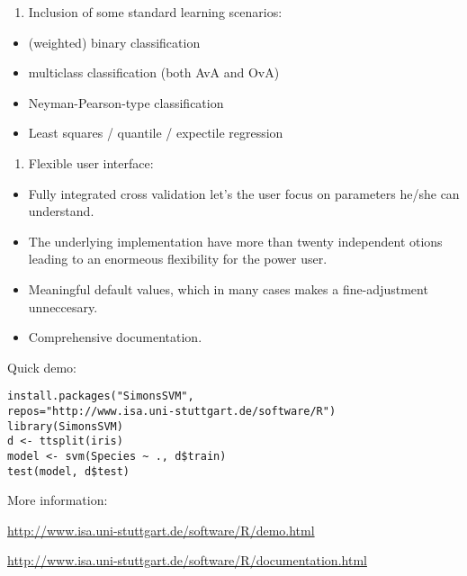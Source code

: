 \documentclass[11pt, a4paper]{article}
\providecommand{\tightlist}{%
  \setlength{\itemsep}{0pt}\setlength{\parskip}{0pt}}
\begin{document}
\begin{enumerate}
\def\labelenumi{\arabic{enumi}.}
\setcounter{enumi}{1}
\tightlist
\item
  Inclusion of some standard learning scenarios:
\end{enumerate}

\begin{itemize}
\tightlist
\item
  (weighted) binary classification
\item
  multiclass classification (both AvA and OvA)
\item
  Neyman-Pearson-type classification
\item
  Least squares / quantile / expectile regression
\end{itemize}

\begin{enumerate}
\def\labelenumi{\arabic{enumi}.}
\setcounter{enumi}{2}
\tightlist
\item
  Flexible user interface:
\end{enumerate}

\begin{itemize}
\tightlist
\item
  Fully integrated cross validation let's the user focus on parameters
  he/she can understand.
\item
  The underlying implementation have more than twenty independent otions
  leading to an enormeous flexibility for the power user.
\item
  Meaningful default values, which in many cases makes a fine-adjustment
  unneccesary.
\item
  Comprehensive documentation.
\end{itemize}

Quick demo:

\begin{verbatim}
install.packages("SimonsSVM",
repos="http://www.isa.uni-stuttgart.de/software/R")
library(SimonsSVM)
d <- ttsplit(iris)
model <- svm(Species ~ ., d$train)
test(model, d$test)
\end{verbatim}

More information:

\url{http://www.isa.uni-stuttgart.de/software/R/demo.html}

\url{http://www.isa.uni-stuttgart.de/software/R/documentation.html}
\end{document}
